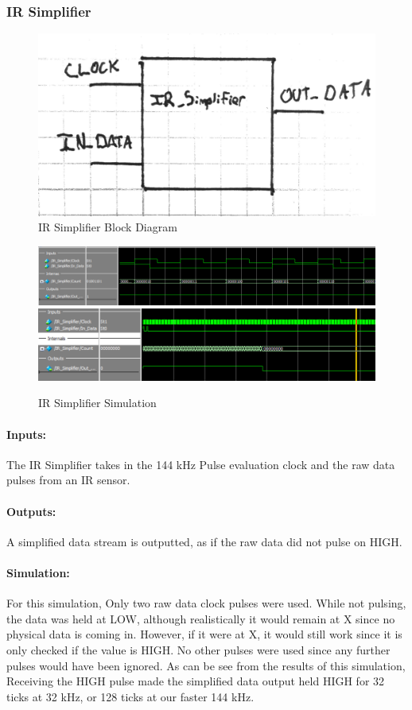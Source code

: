 \documentclass[]{article}
\begin{document}
\subsubsection{IR Simplifier}
\begin{figure}[H]\centering
    \includegraphics[width=0.6\linewidth]{figures/IR_Simplifier_Block.jpg}
    \caption{IR Simplifier Block Diagram}
    \label{fig:irSimplifierBlock}
\end{figure}
\begin{figure}[H]\centering
    \includegraphics[width=\linewidth]{figures/IR_Simplifier_Sim1.png}
    \includegraphics[width=\linewidth]{figures/IR_Simplifier_Sim2.png}
    \caption{IR Simplifier Simulation}
    \label{fig:irSimplifierSim}
\end{figure}
\paragraph{Inputs:} The IR Simplifier takes in the 144 kHz Pulse evaluation clock and the raw data pulses from an IR sensor. 
\paragraph{Outputs:} A simplified data stream is outputted, as if the raw data did not pulse on HIGH.
\paragraph{Simulation:} For this simulation, Only two raw data clock pulses were used. While not pulsing, the data was held at LOW, although realistically it would remain at X since no physical data is coming in. However, if it were at X, it would still work since it is only checked if the value is HIGH. No other pulses were used since any further pulses would have been ignored.
As can be see from the results of this simulation, Receiving the HIGH pulse made the simplified data output held HIGH for 32 ticks at 32 kHz, or 128 ticks at our faster 144 kHz.
\end{document}
